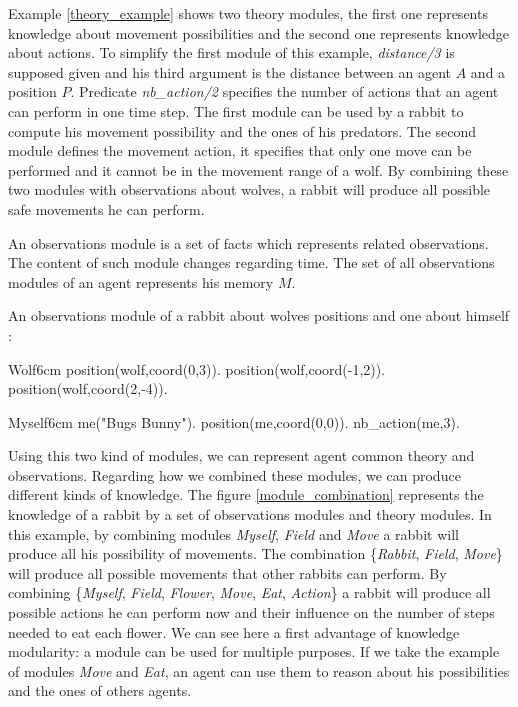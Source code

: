 \documentclass{aamas2012}
\begin{document}
	Example \ref{theory_example} shows two theory modules, the first one represents knowledge about movement possibilities
	and the second one represents knowledge about actions.
	To simplify the first module of this example, \emph{distance/3} is supposed given and 
	his third argument is the distance between an agent $A$ and a position $P$.
	Predicate \emph{nb\_action/2} specifies the number of actions that an agent can perform in one time step.
	The first module can be used by a rabbit to compute his movement possibility and the ones of his predators.
	The second module defines the movement action, it specifies that only one move can be performed and it cannot be in the movement range of a wolf.
	By combining these two modules with observations about wolves, a rabbit will produce all possible safe movements he can perform.

	\begin{definition}
		An observations module is a set of facts which represents related observations.
		The content of such module changes regarding time.
		The set of all observations modules of an agent represents his memory $M$.
	\end{definition}
	
	\begin{example}
		An observations module of a rabbit about wolves positions and one about himself :\newline
		\begin{module}{Wolf}{6cm}
			position(wolf,coord(0,3)).\newline
			position(wolf,coord(-1,2)).\newline
			position(wolf,coord(2,-4)).
		\end{module}
		
		\begin{module}{Myself}{6cm}
			me("Bugs Bunny").\newline
			position(me,coord(0,0)).\newline
			nb\_action(me,3).
		\end{module}
	\end{example}

	Using this two kind of modules, we can represent agent common theory and observations.
	Regarding how we combined these modules, we can produce different kinds of knowledge.
	The figure \ref{module_combination} represents the knowledge of a rabbit by a set of observations modules and theory modules.
	In this example, by combining modules \emph{Myself}, \emph{Field} and \emph{Move} a rabbit will produce all his possibility of movements.
	The combination \{\emph{Rabbit}, \emph{Field}, \emph{Move}\} will produce all possible movements that other rabbits can perform. 
	By combining \{\emph{Myself}, \emph{Field}, \emph{Flower}, \emph{Move}, \emph{Eat}, \emph{Action}\} 
	a rabbit will produce all possible actions he can perform now and their influence on the number of steps needed to eat each flower.
	We can see here a first advantage of knowledge modularity: a module can be used for multiple purposes.
	If we take the example of modules \emph{Move} and \emph{Eat}, an agent can use them to reason about his possibilities and the ones of others agents.
\end{document}

